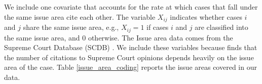 \documentclass{cup-pan}
\begin{document}

We include one covariate that accounts for the rate at which cases that fall under the same issue area cite each other. The variable $X_{ij}$ indicates whether cases $i$ and $j$ share the same issue area, e.g., $X_{ij}=1$ if cases $i$ and $j$ are classified into the same issue area, and $0$ otherwise. The Issue area data comes from the Supreme Court Database (SCDB) \citep{spaeth2014supreme}. We include these variables because \citet{cross2010determinants} finds that the number of citations to Supreme Court opinions depends heavily on the issue area of the case. Table \ref{issue_area_coding} reports the issue areas covered in our data.

\end{document}
